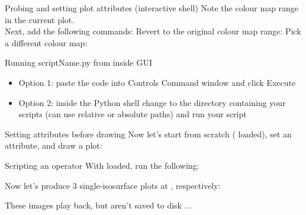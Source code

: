 \begin{frame}{Probing and setting plot attributes (interactive shell)}
  Note the colour map range in the current plot.\\
  Next, add the following commands:
  \setMinMax
  \pause
  Revert to the original colour map range:
  \cancelMinMax
  \pause
  Pick a different colour map:
  \greens
\end{frame}


\begin{frame}{Running scriptName.py from inside GUI}
  \begin{itemize}\setlength{\itemsep}{3mm}
  \item Option 1: paste the code into Controls \ra Command window and click Execute
  \item Option 2: inside the Python shell change to the directory containing your scripts (can use
    relative or absolute paths) and run your script
    \bigskip
    \runScript
  \end{itemize}
\end{frame}

\begin{frame}{Setting attributes before drawing}
  Now let's start from scratch ( loaded), set an attribute, and draw a plot:
  
\end{frame}

\begin{frame}{Scripting an operator}
  With  loaded, run the following:
  
  \pause\bigskip
  {\small Now let's produce 3 single-isosurface plots at , respectively:}
  
  {\small These images play back, but aren't saved to disk ...}
\end{frame}


